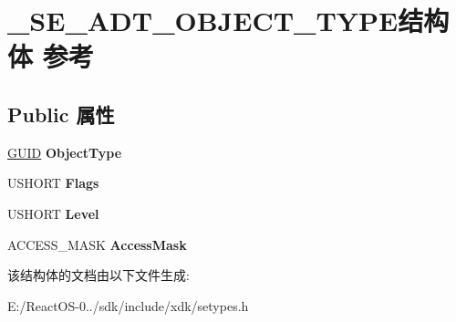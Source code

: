 \hypertarget{struct___s_e___a_d_t___o_b_j_e_c_t___t_y_p_e}{}\section{\+\_\+\+S\+E\+\_\+\+A\+D\+T\+\_\+\+O\+B\+J\+E\+C\+T\+\_\+\+T\+Y\+P\+E结构体 参考}
\label{struct___s_e___a_d_t___o_b_j_e_c_t___t_y_p_e}
\subsection*{Public 属性}
\begin{DoxyCompactItemize}
\item 
\mbox{\label{struct___s_e___a_d_t___o_b_j_e_c_t___t_y_p_e_af50c8528c4846422cda27d9af4a43564}} 
\hyperlink{interface_g_u_i_d}{G\+U\+ID} {\bfseries Object\+Type}
\item 
\mbox{\label{struct___s_e___a_d_t___o_b_j_e_c_t___t_y_p_e_a346f2e1b0cd4ee5956badab063b3a761}} 
U\+S\+H\+O\+RT {\bfseries Flags}
\item 
\mbox{\label{struct___s_e___a_d_t___o_b_j_e_c_t___t_y_p_e_adb5ae5ac146c1e8b646dd0a3f4436267}} 
U\+S\+H\+O\+RT {\bfseries Level}
\item 
\mbox{\label{struct___s_e___a_d_t___o_b_j_e_c_t___t_y_p_e_aba0ba09e98ececf21a142a7795bae403}} 
A\+C\+C\+E\+S\+S\+\_\+\+M\+A\+SK {\bfseries Access\+Mask}
\end{DoxyCompactItemize}


该结构体的文档由以下文件生成\+:\begin{DoxyCompactItemize}
\item 
E\+:/\+React\+O\+S-\/0../sdk/include/xdk/setypes.\+h\end{DoxyCompactItemize}
